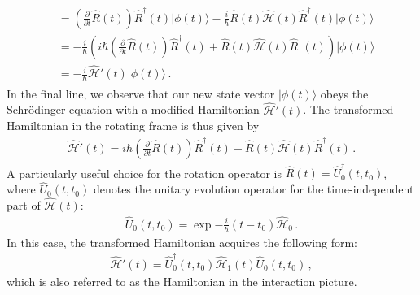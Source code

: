 \documentclass[../Thesis-IJspeert.tex]{subfiles}
\begin{document}
\begin{appendices}
\begin{align}
\begin{split}
&= \left( \frac{\partial}{\partial t} \hat{R}(t) \right) \hat{R}^{\dagger}(t) \lvert \phi(t) \rangle - \frac{i}{\hbar} \hat{R}(t) \hat{\mathcal{H}}(t) \hat{R}^{\dagger}(t) \lvert \phi(t) \rangle \\
&= -\frac{i}{\hbar} \left( i \hbar \left( \frac{\partial}{\partial t} \hat{R}(t) \right) \hat{R}^{\dagger}(t) + \hat{R}(t) \hat{\mathcal{H}}(t) \hat{R}^{\dagger}(t) \right) \lvert \phi(t) \rangle \\
&= -\frac{i}{\hbar} \hat{\mathcal{H}}'(t) \lvert \phi(t) \rangle\,.
\end{split}
\end{align}
In the final line, we observe that our new state vector $\lvert \phi(t) \rangle$ obeys the Schrödinger equation with a modified Hamiltonian $\hat{\mathcal{H}}'(t)$. The transformed Hamiltonian in the rotating frame is thus given by
\begin{align}
\hat{\mathcal{H}}'(t) = i \hbar \left( \frac{\partial}{\partial t} \hat{R}(t) \right) \hat{R}^{\dagger}(t) + \hat{R}(t) \hat{\mathcal{H}}(t) \hat{R}^{\dagger}(t)\,.
\end{align}
A particularly useful choice for the rotation operator is $\hat{R}(t) = \hat{U}_0^\dagger(t, t_0)$, where $\hat{U}_0(t, t_0)$ denotes the unitary evolution operator for the time-independent part of $\hat{\mathcal{H}}(t)$:
\begin{align}
\hat{U}_0(t, t_0) = \exp{-\frac{i}{\hbar} (t - t_0) \hat{\mathcal{H}}_0}\,.
\end{align}
In this case, the transformed Hamiltonian acquires the following form:
\begin{align}
\hat{\mathcal{H}}'(t) = \hat{U}_0^{\dagger}(t, t_0) \hat{\mathcal{H}}_1(t) \hat{U}_0(t, t_0)\,,
\end{align}
which is also referred to as the Hamiltonian in the interaction picture.
\end{appendices}
\end{document}
